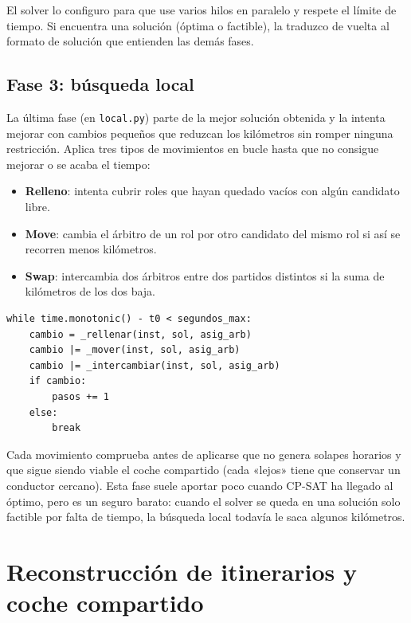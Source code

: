 \documentclass[11pt,a4paper,spanish]{book}
\numberwithin{equation}{chapter}
\numberwithin{figure}{chapter}
\numberwithin{table}{chapter}
\begin{document}
El solver lo configuro para que use varios hilos en paralelo y respete el límite de tiempo. Si encuentra una solución (óptima o factible), la traduzco de vuelta al formato de solución que entienden las demás fases.

\subsection{Fase 3: búsqueda local}

La última fase (en \texttt{local.py}) parte de la mejor solución obtenida y la intenta mejorar con cambios pequeños que reduzcan los kilómetros sin romper ninguna restricción. Aplica tres tipos de movimientos en bucle hasta que no consigue mejorar o se acaba el tiempo:

\begin{itemize}
\item {\bf Relleno}: intenta cubrir roles que hayan quedado vacíos con algún candidato libre.
\item {\bf Move}: cambia el árbitro de un rol por otro candidato del mismo rol si así se recorren menos kilómetros.
\item {\bf Swap}: intercambia dos árbitros entre dos partidos distintos si la suma de kilómetros de los dos baja.
\end{itemize}

\begin{lstlisting}[caption={Bucle principal de la búsqueda local: relleno, move y swap hasta convergencia (\texttt{local.py}).},label={lst:local}]
while time.monotonic() - t0 < segundos_max:
    cambio = _rellenar(inst, sol, asig_arb)
    cambio |= _mover(inst, sol, asig_arb)
    cambio |= _intercambiar(inst, sol, asig_arb)
    if cambio:
        pasos += 1
    else:
        break
\end{lstlisting}

Cada movimiento comprueba antes de aplicarse que no genera solapes horarios y que sigue siendo viable el coche compartido (cada «lejos» tiene que conservar un conductor cercano). Esta fase suele aportar poco cuando CP-SAT ha llegado al óptimo, pero es un seguro barato: cuando el solver se queda en una solución solo factible por falta de tiempo, la búsqueda local todavía le saca algunos kilómetros.

\section{Reconstrucción de itinerarios y coche compartido}
\label{sec:coche}
\end{document}
